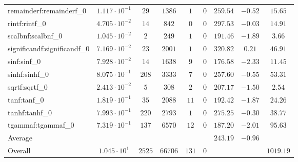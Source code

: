 \begin{tabular}{|l|c|c|c|c|c|c|c|c|}
remainderf:remainderf\_0     & $ 1.117 \cdot 10^{-1} $ & $ 29     $ & $ 1386  $ & $ 1   $ & $ 0   $ & $ 259.54      $ & $ -0.52   $ & $ 15.65   $ \\
rintf:rintf\_0               & $ 4.705 \cdot 10^{-2} $ & $ 14     $ & $ 842   $ & $ 0   $ & $ 0   $ & $ 297.53      $ & $ -0.03   $ & $ 14.91   $ \\
scalbnf:scalbnf\_0           & $ 1.045 \cdot 10^{-2} $ & $ 2      $ & $ 249   $ & $ 1   $ & $ 0   $ & $ 191.46      $ & $ -1.89   $ & $ 3.66    $ \\
significandf:significandf\_0 & $ 7.169 \cdot 10^{-2} $ & $ 23     $ & $ 2001  $ & $ 1   $ & $ 0   $ & $ 320.82      $ & $ 0.21    $ & $ 46.91   $ \\
sinf:sinf\_0                 & $ 7.928 \cdot 10^{-2} $ & $ 14     $ & $ 1638  $ & $ 9   $ & $ 0   $ & $ 176.58      $ & $ -2.33   $ & $ 11.45   $ \\
sinhf:sinhf\_0               & $ 8.075 \cdot 10^{-1} $ & $ 208    $ & $ 3333  $ & $ 7   $ & $ 0   $ & $ 257.60      $ & $ -0.55   $ & $ 53.31   $ \\
sqrtf:sqrtf\_0               & $ 2.413 \cdot 10^{-2} $ & $ 5      $ & $ 308   $ & $ 2   $ & $ 0   $ & $ 207.17      $ & $ -1.50   $ & $ 2.54    $ \\
tanf:tanf\_0                 & $ 1.819 \cdot 10^{-1} $ & $ 35     $ & $ 2088  $ & $ 11  $ & $ 0   $ & $ 192.42      $ & $ -1.87   $ & $ 24.26   $ \\
tanhf:tanhf\_0               & $ 7.993 \cdot 10^{-1} $ & $ 220    $ & $ 2793  $ & $ 1   $ & $ 0   $ & $ 275.25      $ & $ -0.30   $ & $ 38.77   $ \\
tgammaf:tgammaf\_0           & $ 7.319 \cdot 10^{-1} $ & $ 137    $ & $ 6570  $ & $ 12  $ & $ 0   $ & $ 187.20      $ & $ -2.01   $ & $ 95.63   $ \\
\hline
Average                      & $                     $ & $        $ & $       $ & $     $ & $     $ & $ 243.19      $ & $ -0.96   $ & $         $ \\
\hline
Overall                      & $ 1.045 \cdot 10^{1}  $ & $ 2525   $ & $ 66706 $ & $ 131 $ & $ 0   $ & $             $ & $         $ & $ 1019.19 $ \\
\hline
\end{tabular}
